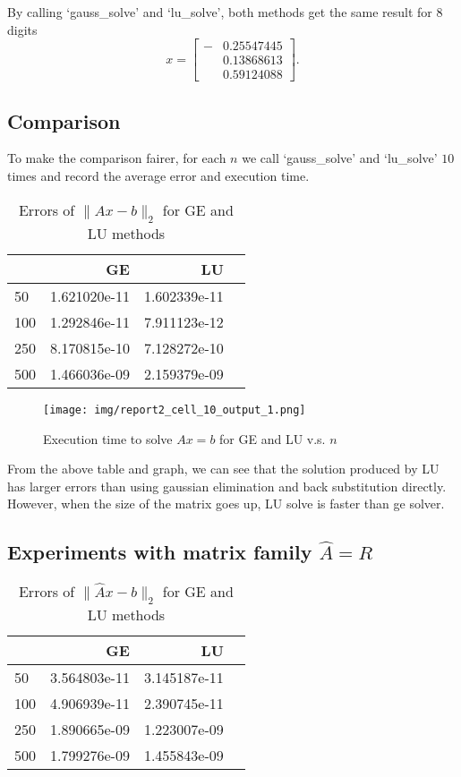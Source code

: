 \documentclass[a4paper,12pt]{article}
\begin{document}
By calling `gauss\_solve' and `lu\_solve',
both methods get the same result for 8 digits
$$
x = \begin{bmatrix}
	-& 0.25547445 \\
	 & 0.13868613 \\
	 & 0.59124088
\end{bmatrix}.
$$

\subsection{Comparison}
To make the comparison fairer,
for each $n$ we call `gauss\_solve' and `lu\_solve' $10$ times
and record the average error and execution time.

\begin{table}[H]
\begin{center}
	\begin{tabular}{lrrr}
	\toprule
	{}  &            GE &            LU \\
	\midrule
	 50 &  1.621020e-11 &  1.602339e-11 \\
	100 &  1.292846e-11 &  7.911123e-12 \\
	250 &  8.170815e-10 &  7.128272e-10 \\
	500 &  1.466036e-09 &  2.159379e-09 \\
	\bottomrule
	\end{tabular}
	\caption{Errors of $\| Ax - b\|_{2}$ for GE and LU methods}
\end{center}
\end{table}

\begin{figure}[H]
    \centering
     \texttt{[image: img/report2\_cell\_10\_output\_1.png]}
     \caption{Execution time to solve $Ax=b$ for GE and LU v.s. $n$}
     \label{fig:1}   
\end{figure}

From the above table and graph, we can see that the solution produced by LU
has larger errors than using gaussian elimination and back substitution directly.
However, when the size of the matrix goes up, LU solve is faster than ge solver.

\subsection{Experiments with matrix family $\hat{A} = R$}

\begin{table}[H]
\begin{center}	
	\begin{tabular}{lrrr}
	\toprule
	{} &             GE &            LU \\
	\midrule
	 50 &  3.564803e-11 &  3.145187e-11 \\
	100 &  4.906939e-11 &  2.390745e-11 \\
	250 &  1.890665e-09 &  1.223007e-09 \\
	500 &  1.799276e-09 &  1.455843e-09 \\
	\bottomrule
	\end{tabular}
	\caption{Errors of $\| \hat{A}x - b\|_{2}$ for GE and LU methods}
\end{center}
\end{table}
\end{document}

